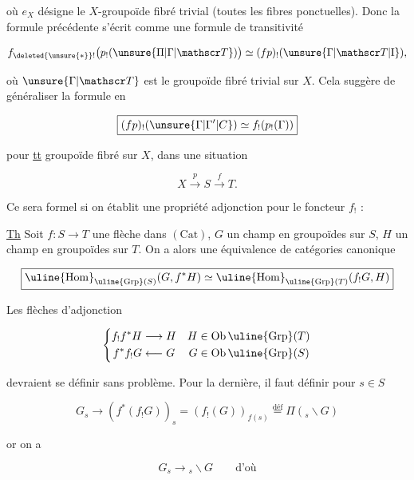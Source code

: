 où $e_X$ désigne le $X$-groupoïde fibré trivial (toutes les fibres ponctuelles). Donc la formule précédente s'écrit comme une formule de transitivité

\[
f_{\deleted{\unsure{*}}!}\bigl(p_!(\unsure{\Pi|\Gamma|\mathscr T})\bigr)\simeq(fp)_!(\unsure{\Gamma|\mathscr T|\mathrm{I}}),
\]

où $\unsure{\Gamma|\mathscr T}$ est le groupoïde fibré trivial sur $X$. Cela suggère de généraliser la formule  en

\[
\boxed{(fp)_!(\unsure{\Gamma|\Gamma'|C})\simeq f_!(p_!(\Gamma))}
\]

pour \uline{tt} groupoïde fibré sur $X$, dans une situation

\[
X\xrightarrow{p}S\xrightarrow{f}T.
\]

Ce sera formel si on établit une propriété  adjonction pour le foncteur $f_!$ : 

\uline{Th} Soit $f\colon S\longrightarrow T$ une  flèche dans $(\mathrm{Cat})$, $G$ un champ en groupoïdes sur $S$, $H$ un champ en groupoïdes sur $T$. On a alors une équivalence de catégories canonique

\[
\boxed{\uline{\mathrm{Hom}}_{\uline{\mathrm{Grp}}(S)}(G,f^*H)
\simeq\uline{\mathrm{Hom}}_{\uline{\mathrm{Grp}}(T)}(f_!G,H)}
\]

Les flèches d'adjonction

\[
\left\{\begin{aligned}
f_!f^*H&\longrightarrow H & H&\in\mathrm{Ob}\,\uline{\mathrm{Grp}}(T)\\
f^*f_!G&\longleftarrow G & G&\in\mathrm{Ob}\,\uline{\mathrm{Grp}}(S)
\end{aligned}\right.
\]

devraient se définir sans problème. Pour la dernière, il faut définir pour $s\in S$

\[
G_s\longrightarrow(f^*(f_!G))_s=(f_!(G))_{f(s)}
\overset{\text{déf}}{=}\Pi({}_{s}\backslash G)
\]

or on a

\[
G_s\longrightarrow {}_{s}\backslash G\qquad\text{d'où}
\]


